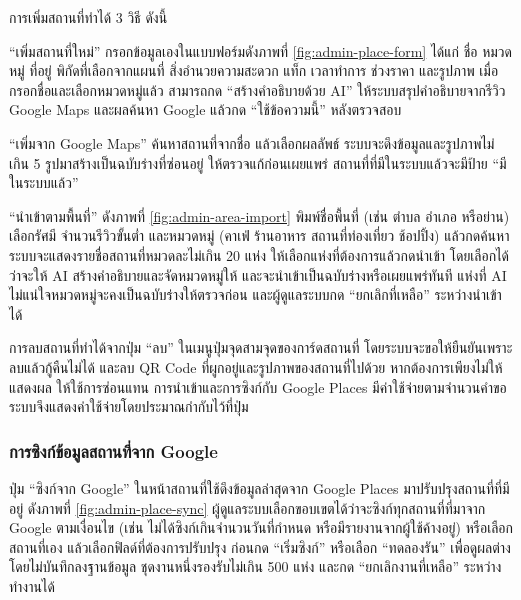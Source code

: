 
การเพิ่มสถานที่ทำได้ 3 วิธี ดังนี้

\begin{numlist}
\item ``เพิ่มสถานที่ใหม่'' กรอกข้อมูลเองในแบบฟอร์มดังภาพที่ \ref{fig:admin-place-form} ได้แก่ ชื่อ หมวดหมู่ ที่อยู่ พิกัดที่เลือกจากแผนที่ สิ่งอำนวยความสะดวก แท็ก เวลาทำการ ช่วงราคา และรูปภาพ เมื่อกรอกชื่อและเลือกหมวดหมู่แล้ว สามารถกด ``สร้างคำอธิบายด้วย AI'' ให้ระบบสรุปคำอธิบายจากรีวิว Google Maps และผลค้นหา Google แล้วกด ``ใช้ข้อความนี้'' หลังตรวจสอบ
\item ``เพิ่มจาก Google Maps'' ค้นหาสถานที่จากชื่อ แล้วเลือกผลลัพธ์ ระบบจะดึงข้อมูลและรูปภาพไม่เกิน 5 รูปมาสร้างเป็นฉบับร่างที่ซ่อนอยู่ ให้ตรวจแก้ก่อนเผยแพร่ สถานที่ที่มีในระบบแล้วจะมีป้าย ``มีในระบบแล้ว''
\item ``นำเข้าตามพื้นที่'' ดังภาพที่ \ref{fig:admin-area-import} พิมพ์ชื่อพื้นที่ (เช่น ตำบล อำเภอ หรือย่าน) เลือกรัศมี จำนวนรีวิวขั้นต่ำ และหมวดหมู่ (คาเฟ่ ร้านอาหาร สถานที่ท่องเที่ยว ช้อปปิ้ง) แล้วกดค้นหา ระบบจะแสดงรายชื่อสถานที่หมวดละไม่เกิน 20 แห่ง ให้เลือกแห่งที่ต้องการแล้วกดนำเข้า โดยเลือกได้ว่าจะให้ AI สร้างคำอธิบายและจัดหมวดหมู่ให้ และจะนำเข้าเป็นฉบับร่างหรือเผยแพร่ทันที แห่งที่ AI ไม่แน่ใจหมวดหมู่จะคงเป็นฉบับร่างให้ตรวจก่อน และผู้ดูแลระบบกด ``ยกเลิกที่เหลือ'' ระหว่างนำเข้าได้
\end{numlist}



การลบสถานที่ทำได้จากปุ่ม ``ลบ'' ในเมนูปุ่มจุดสามจุดของการ์ดสถานที่ โดยระบบจะขอให้ยืนยันเพราะลบแล้วกู้คืนไม่ได้ และลบ QR Code ที่ผูกอยู่และรูปภาพของสถานที่ไปด้วย หากต้องการเพียงไม่ให้แสดงผล ให้ใช้การซ่อนแทน การนำเข้าและการซิงก์กับ Google Places มีค่าใช้จ่ายตามจำนวนคำขอ ระบบจึงแสดงค่าใช้จ่ายโดยประมาณกำกับไว้ที่ปุ่ม

\subsubsection{การซิงก์ข้อมูลสถานที่จาก Google}

ปุ่ม ``ซิงก์จาก Google'' ในหน้าสถานที่ใช้ดึงข้อมูลล่าสุดจาก Google Places มาปรับปรุงสถานที่ที่มีอยู่ ดังภาพที่ \ref{fig:admin-place-sync} ผู้ดูแลระบบเลือกขอบเขตได้ว่าจะซิงก์ทุกสถานที่ที่มาจาก Google ตามเงื่อนไข (เช่น ไม่ได้ซิงก์เกินจำนวนวันที่กำหนด หรือมีรายงานจากผู้ใช้ค้างอยู่) หรือเลือกสถานที่เอง แล้วเลือกฟิลด์ที่ต้องการปรับปรุง ก่อนกด ``เริ่มซิงก์'' หรือเลือก ``ทดลองรัน'' เพื่อดูผลต่างโดยไม่บันทึกลงฐานข้อมูล ชุดงานหนึ่งรองรับไม่เกิน 500 แห่ง และกด ``ยกเลิกงานที่เหลือ'' ระหว่างทำงานได้

